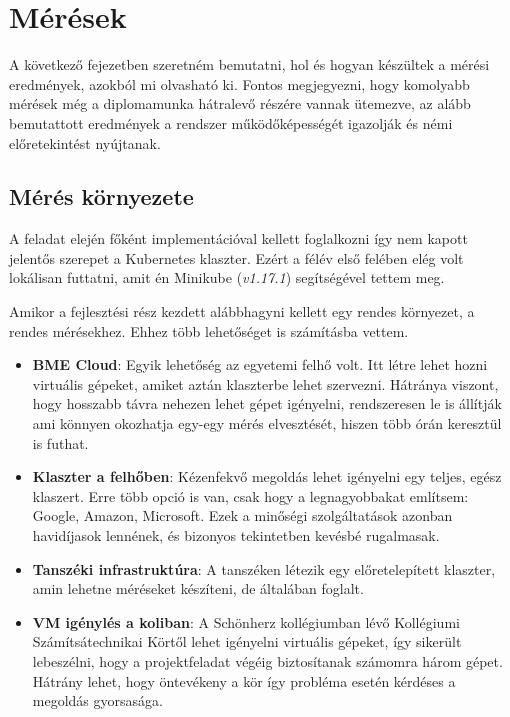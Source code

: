 \chapter{Mérések}
\label{sec:results}

A következő fejezetben szeretném bemutatni, hol és hogyan készültek a mérési eredmények, azokból mi olvasható ki. Fontos megjegyezni, hogy komolyabb mérések még a diplomamunka hátralevő részére vannak ütemezve, az alább bemutattott eredmények a rendszer működőképességét igazolják és némi előretekintést nyújtanak.

\section{Mérés környezete}
A feladat elején főként implementációval kellett foglalkozni így nem kapott jelentős szerepet a Kubernetes klaszter. Ezért  a félév első felében elég volt lokálisan futtatni, amit én Minikube (\textit{v1.17.1}) segítségével tettem meg. 

Amikor a fejlesztési rész kezdett alábbhagyni kellett egy rendes környezet, a rendes mérésekhez. Ehhez több lehetőséget is számításba vettem.	

\begin{itemize}
  \item \textbf{BME Cloud}: Egyik lehetőség az egyetemi felhő volt. Itt létre lehet hozni virtuális gépeket, amiket aztán klaszterbe lehet szervezni. Hátránya viszont, hogy hosszabb távra nehezen lehet gépet igényelni, rendszeresen le is állítják ami könnyen okozhatja egy-egy mérés elvesztését, hiszen több órán keresztül is futhat.
  \item \textbf{Klaszter a felhőben}: Kézenfekvő megoldás lehet igényelni egy teljes, egész klaszert. Erre több opció is van, csak hogy a legnagyobbakat említsem: Google, Amazon, Microsoft. Ezek a minőségi szolgáltatások azonban havidíjasok lennének, és bizonyos tekintetben kevésbé rugalmasak.
    \item \textbf{Tanszéki infrastruktúra}: A tanszéken létezik egy előretelepített klaszter, amin lehetne méréseket készíteni, de általában foglalt.
      \item \textbf{VM igénylés a koliban}: A Schönherz kollégiumban lévő Kollégiumi Számítsátechnikai Körtől lehet igényelni virtuális gépeket, így sikerült lebeszélni, hogy a projektfeladat végéig biztosítanak számomra három gépet. Hátrány lehet, hogy öntevékeny a kör így probléma esetén kérdéses a megoldás gyorsasága. 
\end{itemize}		

